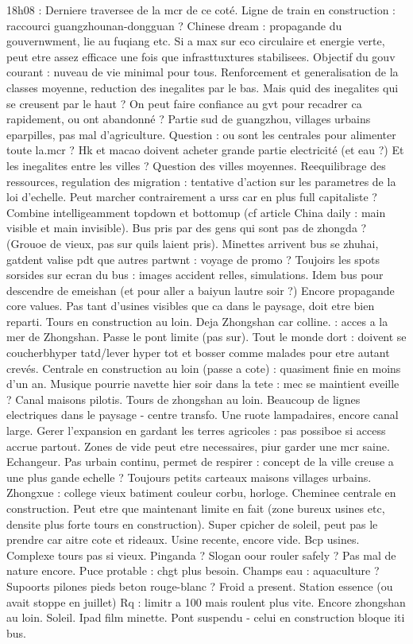 18h08 :
Derniere traversee de la mcr de ce coté. Ligne de train en construction : raccourci guangzhounan-dongguan ?
Chinese dream : propagande du gouvernwment, lie au fuqiang etc. 
Si a max sur eco circulaire et energie verte, peut etre assez efficace une fois que infrasttuxtures stabilisees. Objectif du gouv courant : nuveau de vie minimal pour tous. Renforcement et generalisation de la classes moyenne, reduction des inegalites par le bas. Mais quid des inegalites qui se creusent par le haut ? On peut faire confiance au gvt pour recadrer ca rapidement, ou ont abandonné ?
Partie sud de guangzhou, villages urbains eparpilles, pas mal d'agriculture. Question : ou sont les centrales pour alimenter toute la.mcr ? Hk et macao doivent acheter grande partie electricité (et eau ?)
Et les inegalites entre les villes ? Question des villes moyennes. Reequilibrage des ressources, regulation des migration : tentative d'action sur les parametres de la loi d'echelle. Peut marcher contrairement a urss car en plus full capitaliste ? Combine intelligeamment topdown et bottomup (cf article China daily : main visible et main invisible).
Bus pris par des gens qui sont pas de zhongda ? (Grouoe de vieux, pas sur quils laient pris). Minettes arrivent bus se zhuhai, gatdent valise pdt que autres partwnt : voyage de promo ?
Toujoirs les spots sorsides sur ecran du bus : images accident relles, simulations. Idem bus pour descendre de emeishan (et pour aller a baiyun lautre soir ?)
Encore propagande core values. Pas tant d'usines visibles que ca dans le paysage, doit etre bien reparti. Tours en construction au loin. Deja Zhongshan car colline. : acces a la mer de Zhongshan. Passe le pont limite (pas sur).
Tout le monde dort : doivent se coucherbhyper tatd/lever hyper tot et bosser comme malades pour etre autant crevés. Centrale en construction au loin (passe a cote) : quasiment finie en moins d'un an.
Musique pourrie navette hier soir dans la tete : mec se maintient eveille ?
Canal maisons pilotis. Tours de zhongshan au loin. Beaucoup de lignes electriques dans le paysage - centre transfo.
Une ruote lampadaires, encore canal large.
Gerer l'expansion en gardant les terres agricoles : pas possiboe si access accrue partout. Zones de vide peut etre necessaires, piur garder une mcr saine.
Echangeur.
Pas urbain continu, permet de respirer : concept de la ville creuse a une plus gande echelle ?
Toujours petits carteaux maisons villages urbains.
Zhongxue : college vieux batiment couleur corbu, horloge. Cheminee centrale en construction.
Peut etre que maintenant limite en fait (zone bureux usines etc, densite plus forte tours en construction). Super cpicher de soleil, peut pas le prendre car aitre cote et rideaux.
Usine recente, encore vide. Bcp usines. Complexe tours pas si vieux. 
Pinganda ? Slogan oour rouler safely ?
Pas mal de nature encore.
Puce protable : chgt plus besoin.
Champs eau : aquaculture ?
Supoorts pilones pieds beton rouge-blanc ?
Froid a present.
Station essence (ou avait stoppe en juillet)
Rq : limitr a 100 mais roulent plus vite.
Encore zhongshan au loin. Soleil. Ipad film minette.
Pont suspendu - celui en construction bloque iti bus.






